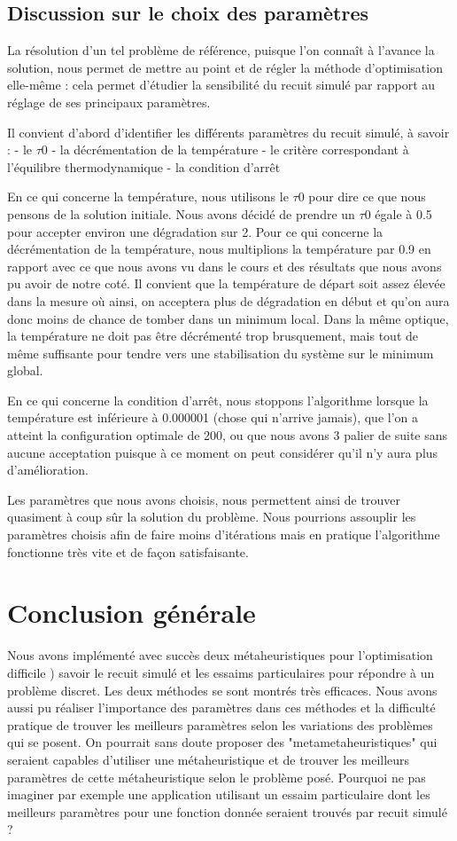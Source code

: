 \documentclass{report}
\begin{document}
\section{Discussion sur le choix des paramètres}
La résolution d'un tel problème de référence, puisque l'on connaît à l'avance la solution, nous permet de mettre au point et de régler la méthode d'optimisation elle-même : cela permet d'étudier la sensibilité du recuit simulé par rapport au réglage de ses principaux paramètres.

Il convient d'abord d'identifier les différents paramètres du recuit simulé, à savoir :
- le $\tau 0$
- la décrémentation de la température
- le critère correspondant à l'équilibre thermodynamique
- la condition d'arrêt

En ce qui concerne la température, nous utilisons le $\tau 0$ pour dire ce que nous pensons de la solution initiale. Nous avons décidé de prendre un $\tau 0$ égale à 0.5 pour accepter environ une dégradation sur 2. Pour ce qui concerne la décrémentation de la température, nous multiplions la température par 0.9 en rapport avec ce que nous avons vu dans le cours et des résultats que nous avons pu avoir de notre coté. Il convient que la température de départ soit assez élevée dans la mesure où ainsi, on acceptera plus de dégradation en début et qu'on aura donc moins de chance de tomber dans un minimum local. Dans la même optique, la température ne doit pas être décrémenté trop brusquement, mais tout de même suffisante pour tendre vers une stabilisation du système sur le minimum global.

En ce qui concerne la condition d'arrêt, nous stoppons l'algorithme lorsque la température est inférieure à 0.000001 (chose qui n'arrive jamais), que l'on a atteint la configuration optimale de 200, ou que nous avons 3 palier de suite sans aucune acceptation puisque à ce moment on peut considérer qu'il n'y aura plus d'amélioration.

Les paramètres que nous avons choisis, nous permettent ainsi de trouver quasiment à coup sûr la solution du problème. Nous pourrions assouplir les paramètres choisis afin de faire moins d'itérations mais en pratique l'algorithme fonctionne très vite et de façon satisfaisante.

\chapter{Conclusion générale}
Nous avons implémenté avec succès deux métaheuristiques pour l'optimisation difficile ) savoir le recuit simulé et les essaims particulaires pour répondre à un problème discret. Les deux méthodes se sont montrés très efficaces. Nous avons aussi pu réaliser l'importance des paramètres dans ces méthodes et la difficulté pratique de trouver les meilleurs paramètres selon les variations des problèmes qui se posent. On pourrait sans doute proposer des "metametaheuristiques" qui seraient capables d’utiliser une métaheuristique et de trouver
les meilleurs paramètres de cette métaheuristique selon le problème posé. Pourquoi
ne pas imaginer par exemple une application utilisant un essaim particulaire dont les
meilleurs paramètres pour une fonction donnée seraient trouvés par recuit simulé ?
\end{document}
